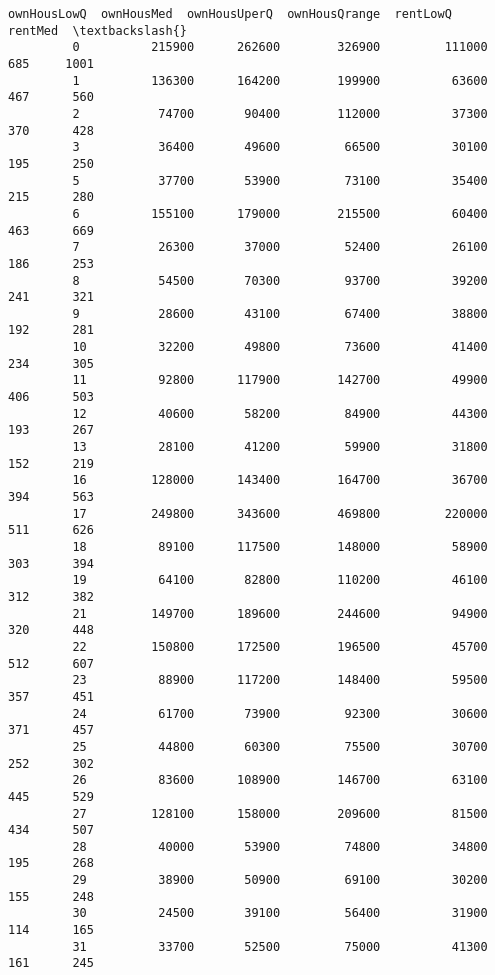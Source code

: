 \documentclass[11pt]{llncs}
\begin{document}
\begin{Verbatim}[commandchars=\\\{\}]
               ownHousLowQ  ownHousMed  ownHousUperQ  ownHousQrange  rentLowQ  rentMed  \textbackslash{}
         0          215900      262600        326900         111000       685     1001   
         1          136300      164200        199900          63600       467      560   
         2           74700       90400        112000          37300       370      428   
         3           36400       49600         66500          30100       195      250   
         5           37700       53900         73100          35400       215      280   
         6          155100      179000        215500          60400       463      669   
         7           26300       37000         52400          26100       186      253   
         8           54500       70300         93700          39200       241      321   
         9           28600       43100         67400          38800       192      281   
         10          32200       49800         73600          41400       234      305   
         11          92800      117900        142700          49900       406      503   
         12          40600       58200         84900          44300       193      267   
         13          28100       41200         59900          31800       152      219   
         16         128000      143400        164700          36700       394      563   
         17         249800      343600        469800         220000       511      626   
         18          89100      117500        148000          58900       303      394   
         19          64100       82800        110200          46100       312      382   
         21         149700      189600        244600          94900       320      448   
         22         150800      172500        196500          45700       512      607   
         23          88900      117200        148400          59500       357      451   
         24          61700       73900         92300          30600       371      457   
         25          44800       60300         75500          30700       252      302   
         26          83600      108900        146700          63100       445      529   
         27         128100      158000        209600          81500       434      507   
         28          40000       53900         74800          34800       195      268   
         29          38900       50900         69100          30200       155      248   
         30          24500       39100         56400          31900       114      165   
         31          33700       52500         75000          41300       161      245   

\end{Verbatim}
\end{document}
